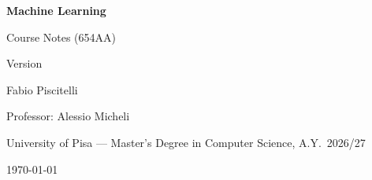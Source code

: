 \documentclass[11pt,a4paper,oneside,openany]{book}
\begin{document}
\hypersetup{pageanchor=false}
\begin{titlepage}
\centering
\vspace*{3cm}
{\Huge\bfseries\color{inkblue} Machine Learning\par}
\vspace{0.6cm}
{\Large\color{accentblue} Course Notes (654AA)\par}
\vspace{0.3cm}
{\large\color{gray!70!black} Version \docversion\par}
\vspace{2.2cm}
{\large Fabio Piscitelli\par}
\vspace{0.4cm}
{\normalsize Professor: Alessio Micheli\par}
{\normalsize University of Pisa --- Master's Degree in Computer Science, A.Y.\ 2026/27\par}
\vfill
{\normalsize \today\par}
\end{titlepage}

\frontmatter
\hypersetup{pageanchor=true}
\tableofcontents

\mainmatter


























\end{document}
